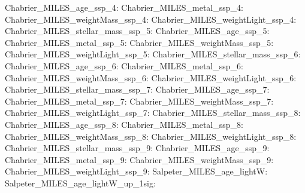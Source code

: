 Chabrier\_MILES\_age\_ssp\_4:  \newline 
Chabrier\_MILES\_metal\_ssp\_4:  \newline 
Chabrier\_MILES\_weightMass\_ssp\_4:  \newline 
Chabrier\_MILES\_weightLight\_ssp\_4:  \newline 
Chabrier\_MILES\_stellar\_mass\_ssp\_5:  \newline 
Chabrier\_MILES\_age\_ssp\_5:  \newline 
Chabrier\_MILES\_metal\_ssp\_5:  \newline 
Chabrier\_MILES\_weightMass\_ssp\_5:  \newline 
Chabrier\_MILES\_weightLight\_ssp\_5:  \newline 
Chabrier\_MILES\_stellar\_mass\_ssp\_6:  \newline 
Chabrier\_MILES\_age\_ssp\_6:  \newline 
Chabrier\_MILES\_metal\_ssp\_6:  \newline 
Chabrier\_MILES\_weightMass\_ssp\_6:  \newline 
Chabrier\_MILES\_weightLight\_ssp\_6:  \newline 
Chabrier\_MILES\_stellar\_mass\_ssp\_7:  \newline 
Chabrier\_MILES\_age\_ssp\_7:  \newline 
Chabrier\_MILES\_metal\_ssp\_7:  \newline 
Chabrier\_MILES\_weightMass\_ssp\_7:  \newline 
Chabrier\_MILES\_weightLight\_ssp\_7:  \newline 
Chabrier\_MILES\_stellar\_mass\_ssp\_8:  \newline 
Chabrier\_MILES\_age\_ssp\_8:  \newline 
Chabrier\_MILES\_metal\_ssp\_8:  \newline 
Chabrier\_MILES\_weightMass\_ssp\_8:  \newline 
Chabrier\_MILES\_weightLight\_ssp\_8:  \newline 
Chabrier\_MILES\_stellar\_mass\_ssp\_9:  \newline 
Chabrier\_MILES\_age\_ssp\_9:  \newline 
Chabrier\_MILES\_metal\_ssp\_9:  \newline 
Chabrier\_MILES\_weightMass\_ssp\_9:  \newline 
Chabrier\_MILES\_weightLight\_ssp\_9:  \newline 
Salpeter\_MILES\_age\_lightW:  \newline 
Salpeter\_MILES\_age\_lightW\_up\_1sig:  \newline 

